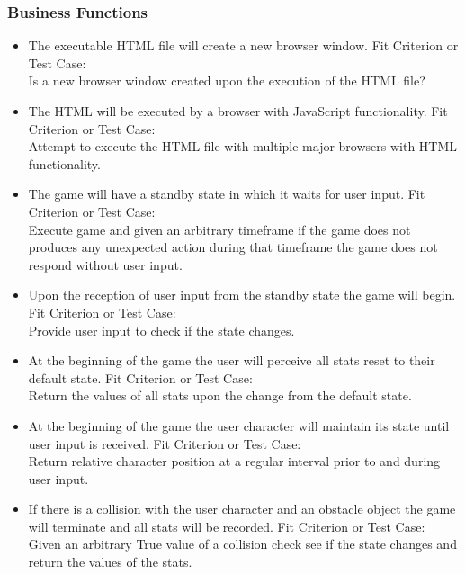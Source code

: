 \documentclass[11pt, oneside]{article}   	%
\begin{document}
\subsubsection{Business Functions}
\begin{itemize}
\item
The executable HTML file will create a new browser window.
\subitem
Fit Criterion or Test Case: \\
Is a new browser window created upon the execution of the HTML file?

\item
The HTML will be executed by a browser with JavaScript functionality.
\subitem
Fit Criterion or Test Case: \\
Attempt to execute the HTML file with multiple major browsers with HTML functionality.

\item
The game will have a standby state in which it waits for user input.
\subitem
Fit Criterion or Test Case: \\
Execute game and given an arbitrary timeframe if the game does not produces any unexpected action during that timeframe the game does not respond without user input.

\item
Upon the reception of user input from the standby state the game will begin.
\subitem
Fit Criterion or Test Case: \\
Provide user input to check if the state changes.

\item
At the beginning of the game the user will perceive all stats reset to their default state.
\subitem
Fit Criterion or Test Case: \\
Return the values of all stats upon the change from the default state.

\item
At the beginning of the game the user character will maintain its state until user input is received.
\subitem
Fit Criterion or Test Case: \\
Return relative character position at a regular interval prior to and during user input.

\item
If there is a collision with the user character and an obstacle object the game will terminate and all stats will be recorded.
\subitem
Fit Criterion or Test Case: \\
Given an arbitrary True value of a collision check see if the state changes and return the values of the stats.


\end{itemize}
\end{document}
